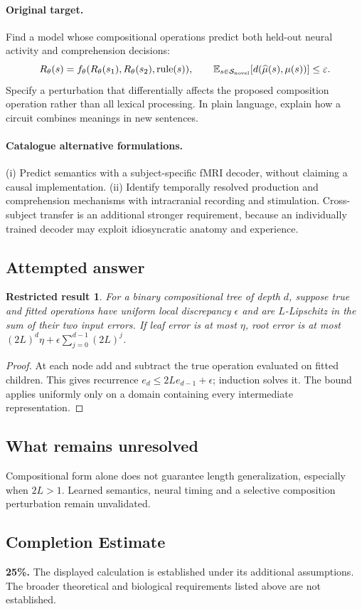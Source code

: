 \documentclass[11pt]{article}
\newcommand{\E}{\mathbb E}
\providecommand{\E}{\mathbb E}
\newtheorem{attemptresult}{Restricted result}[section]
\begin{document}
\paragraph{Original target.}
Find a model whose compositional operations predict both held-out neural activity and comprehension decisions:
\[
R_\theta(s)=f_\theta(R_\theta(s_1),R_\theta(s_2),\operatorname{rule}(s)),
\qquad
\E_{s\in\mathcal S_{\rm novel}}[d(\widehat\mu(s),\mu(s))]\leq\varepsilon.
\]
Specify a perturbation that differentially affects the proposed composition operation rather than all lexical processing. In plain language, explain how a circuit combines meanings in new sentences.
\paragraph{Catalogue alternative formulations.}
(i) Predict semantics with a subject-specific fMRI decoder, without claiming a causal implementation. (ii) Identify temporally resolved production and comprehension mechanisms with intracranial recording and stimulation. Cross-subject transfer is an additional stronger requirement, because an individually trained decoder may exploit idiosyncratic anatomy and experience.
\subsection{Attempted answer}
\begin{attemptresult}
For a binary compositional tree of depth $d$, suppose true and fitted operations have uniform local discrepancy $\epsilon$ and are $L$-Lipschitz in the sum of their two input errors. If leaf error is at most $\eta$, root error is at most $(2L)^d\eta+\epsilon\sum_{j=0}^{d-1}(2L)^j$.
\end{attemptresult}
\begin{proof}
At each node add and subtract the true operation evaluated on fitted children. This gives recurrence $e_d\leq2Le_{d-1}+\epsilon$; induction solves it. The bound applies uniformly only on a domain containing every intermediate representation.
\end{proof}
\subsection{What remains unresolved}
Compositional form alone does not guarantee length generalization, especially when $2L>1$. Learned semantics, neural timing and a selective composition perturbation remain unvalidated.
\subsection{Completion Estimate}
\textbf{25\%.} The displayed calculation is established under its additional assumptions. The broader theoretical and biological requirements listed above are not established.
\end{document}
